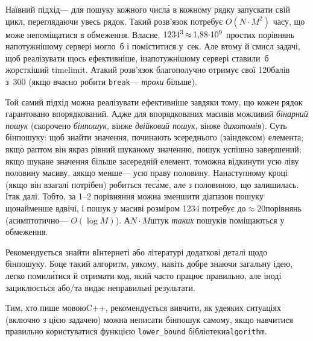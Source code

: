 \documentclass[14pt,a4paper]{extarticle}
\def\dib#1{\,#1\discretionary{}{\mbox{$#1$}}{}\,}
\begin{document}
Наївний підхід\nolinebreak[3] --- для пошуку кожного числ\'{а} в кожному рядку запускати свій цикл, переглядаючи увесь рядок. Такий розв'язок потребує $O(N{\cdot}M^2)$ часу, що може не\nolinebreak[3] поміщатися в обмеження. Власне, $1234^3\dib{{\approx}}{1{,}88{\cdot}10^9}$ простих порівнянь на\nolinebreak[2] потужнішому сервері могло~б і поміститися у~сек. Але в\nolinebreak[3] тому й смисл задачі, щоб реалізувати щось ефективніше, і\nolinebreak[3] на\nolinebreak[3] потужнішому сервері ставили~б жорсткіший time\nolinebreak[2] limit. А\nolinebreak[3] такий розв'язок благополучно отримує свої 120\nolinebreak[3] балів з~300 (якщо вчасно робити \texttt{break}\nolinebreak[3] --- \emph{трохи} більше).

Той самий підхід можна реалізувати ефективніше завдяки тому, що кожен рядок гарантовано впорядкований. Адже для впорядкованих масивів можливий \emph{бінарний пошук} (скорочено \emph{бін\-пошук}, він\nolinebreak[3] же \emph{двійковий пошук}, він\nolinebreak[3] же \emph{дихотомія}). Суть бінпошуку: щоб знайти значення, починають з\nolinebreak[3] середнього (за\nolinebreak[3] індексом) елемента; якщо раптом він якраз рівний шуканому значенню, пошук успішно завершений; якщо шукане значення більше за\nolinebreak[3] середній елемент, то\nolinebreak[3] можна відкинути усю ліву половину масиву, а\nolinebreak[3] якщо менше\nolinebreak[3] --- усю праву половину. На\nolinebreak[3] наступному кроці (якщо він взагалі потрібен) робиться те\nolinebreak[3] с\'{а}ме, але з половиною, що залишилась. І\nolinebreak[3] так далі. Тобто, за 1--2 порівняння можна зменшити діапазон пошуку щонайменше вдвічі, і пошук у масиві розміром 1234 потребує до\nolinebreak[2] ${\approx}20$\nolinebreak[3] порівнянь (асимптотично\nolinebreak[3] --- $O(\log{}M)$). А\nolinebreak[3] $N{\cdot}M$\nolinebreak[2] штук \emph{таких} пошуків поміщаються у обмеження. 

Рекомендується знайти в\nolinebreak[3] Інтернеті або літературі додаткові деталі щодо бін\-пошуку. Бо\nolinebreak[3] це такий алгоритм, у\nolinebreak[3] якому, навіть добре знаючи загальну ідею, легко помил\'{и}тися й отримати код, який часто працює правильно, але іноді зациклюється або/та видає неправильні результати. 

Тим, хто пише мовою\nolinebreak[3] C++, рекомендується вивчити, як у\nolinebreak[3] деяких ситуаціях (включно з цією задачею) можна не\nolinebreak[3] писати бін\-пошук самому, якщо навчитися правильно користуватися функцією \verb"lower_bound" бібліотеки\nolinebreak[2] \texttt{algorithm}.
\end{document}
